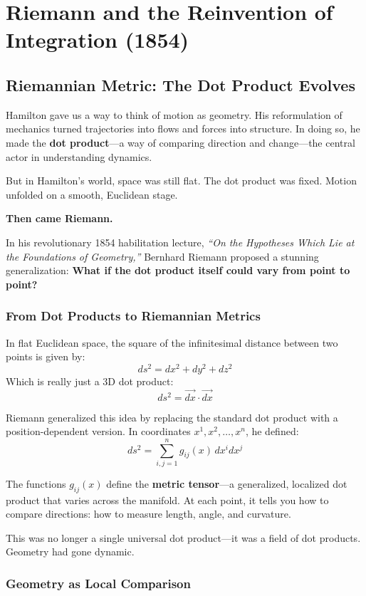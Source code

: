 \section{Riemann and the Reinvention of Integration (1854)}

\subsection{Riemannian Metric: The Dot Product Evolves}

Hamilton gave us a way to think of motion as geometry. His reformulation of mechanics turned trajectories into flows and forces into structure. In doing so, he made the \textbf{dot product}—a way of comparing direction and change—the central actor in understanding dynamics.

But in Hamilton’s world, space was still flat. The dot product was fixed. Motion unfolded on a smooth, Euclidean stage.

\medskip

\textbf{Then came Riemann.}

In his revolutionary 1854 habilitation lecture, \textit{“On the Hypotheses Which Lie at the Foundations of Geometry,”} Bernhard Riemann proposed a stunning generalization:  
\textbf{What if the dot product itself could vary from point to point?}

\subsubsection*{From Dot Products to Riemannian Metrics}

In flat Euclidean space, the square of the infinitesimal distance between two points is given by:
\[
ds^2 = dx^2 + dy^2 + dz^2
\]
Which is really just a 3D dot product:
\[
ds^2 = \vec{dx} \cdot \vec{dx}
\]

Riemann generalized this idea by replacing the standard dot product with a position-dependent version. In coordinates \( x^1, x^2, \dots, x^n \), he defined:
\[
ds^2 = \sum_{i,j=1}^n g_{ij}(x) \, dx^i dx^j
\]

The functions \( g_{ij}(x) \) define the \textbf{metric tensor}—a generalized, localized dot product that varies across the manifold. At each point, it tells you how to compare directions: how to measure length, angle, and curvature.

This was no longer a single universal dot product—it was a field of dot products. Geometry had gone dynamic.

\subsubsection*{Geometry as Local Comparison}

